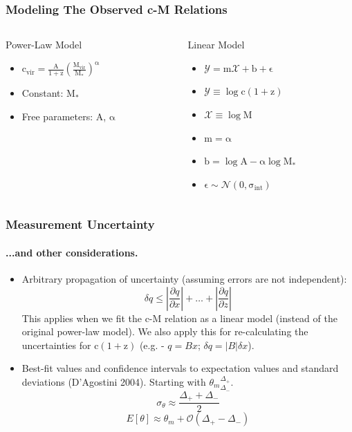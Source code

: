 \documentclass[hyperref={pdfpagelabels=false}]{beamer}
\begin{document}
\begin{frame}
  \frametitle{Modeling The Observed c-M Relations}
  \begin{columns}
    \begin{column}{0.5\textwidth}
      \begin{block}{Power-Law Model}
        \begin{itemize}
        \item $\mathrm{c_{vir} = \frac{A}{1+z} \left( \frac{M_{vir}}{M_{*}}
          \right)^{\alpha}}$
        \item Constant: $\mathrm{M_{*}}$
        \item Free parameters: A, $\mathrm{\alpha}$ 
        \end{itemize}
      \end{block}
    \end{column}
    \begin{column}{0.5\textwidth}
      \begin{block}{Linear Model}
        \begin{itemize}
        \item $\mathrm{\mathcal{Y} = m\mathcal{X}+b + \epsilon}$   
        \item $\mathrm{\mathcal{Y} \equiv \log c (1+z)}$
        \item $\mathrm{\mathcal{X} \equiv \log M}$
        \item $\mathrm{m = \alpha}$
        \item $\mathrm{b = \log A - \alpha \log M_{*}}$
        \item $\mathrm{\epsilon \sim \mathcal{N}(0,\sigma_{int})}$
        \end{itemize}
      \end{block}
    \end{column}
  \end{columns}
\end{frame}

\begin{frame}
\frametitle{Measurement Uncertainty}
\framesubtitle{...and other considerations.}
\begin{itemize}
\item Arbitrary propagation of uncertainty (assuming errors are not
  independent):
\[ \delta q  \leq \left| \frac{\partial q}{\partial x} \right| + \ldots + \left|
  \frac{\partial q}{\partial z} \right| \]
This applies when we fit the c-M relation as a linear model (instead of the
original power-law model). We also apply this for re-calculating the
uncertainties for $\mathrm{c(1+z)}$ (e.g. - $q = Bx$; $\delta q = |B|\delta
x$).
\item Best-fit values and confidence intervals to expectation values and
  standard deviations (D'Agostini 2004). Starting with
  ${\theta_m}^{\Delta_{+}}_{\Delta _{-}}$. 
\[ \sigma_{\theta} \approx \frac{\Delta_{+} + \Delta_{-}}{2} \]
\[ E[\theta] \approx \theta_{m} + \mathcal{O}(\Delta_{+} -\Delta_{-}) \]
\end{itemize}
\end{frame}
\end{document}
